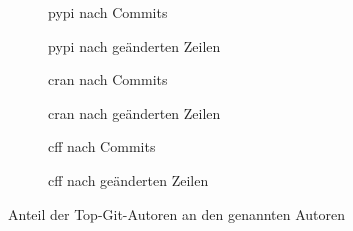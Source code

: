 \begin{figure}[H]
    \begin{subfigure}{.5\textwidth}
        \centering
        
        \caption{\gls{pypi} nach Commits}
        \label{fig:common_authors_pypi}
    \end{subfigure}%
    \begin{subfigure}{.5\textwidth}
        \centering
        
        \caption{\gls{pypi} nach geänderten Zeilen}
        \label{fig:common_authors_by_lines_pypi}
    \end{subfigure}
    \begin{subfigure}{.5\textwidth}
        \centering
        
        \caption{\gls{cran} nach Commits}
        \label{fig:common_authors_cran}
    \end{subfigure}%
    \begin{subfigure}{.5\textwidth}
        \centering
        
        \caption{\gls{cran} nach geänderten Zeilen}
        \label{fig:common_authors_by_lines_cran}
    \end{subfigure}
    \begin{subfigure}{.5\textwidth}
        \centering
        
        \caption{\gls{cff} nach Commits}
        \label{fig:common_authors_cff}
    \end{subfigure}%
    \begin{subfigure}{.5\textwidth}
        \centering
        
        \caption{\gls{cff} nach geänderten Zeilen}
        \label{fig:common_authors_by_lines_cff}
    \end{subfigure}
    \caption{Anteil der Top-Git-Autoren an den genannten Autoren}
    \label{fig:common_authors_anhang}
\end{figure}

